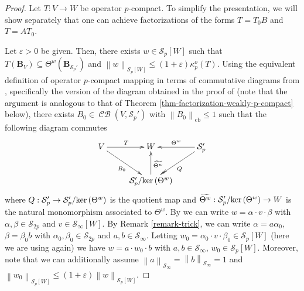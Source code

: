 \documentclass[11pt]{amsart}
\DeclareMathOperator{\cb}{cb}
\DeclareMathOperator{\CB}{\mathcal{CB}}
\newcommand{\n}[1]{ \left\|#1\right\| }
\numberwithin{equation}{section}
\def\ker{{\rm ker\, }}
\begin{document}
\begin{proof}
Let $T : V \to W$ be operator $p$-compact. To simplify the presentation, we will show separately that one can achieve factorizations of the forms $T = T_0B$ and $T=AT_0$.

Let $\varepsilon>0$ be given. Then, there exists $w \in \mathcal{S}_p[W]$ such that $T(\mathbf{B}_V) \subseteq \Theta^w(\mathbf{B}_{\mathcal{S}_p'})$ and $\n{w}_{\mathcal{S}_p[W]} \le (1+\varepsilon)\kappa_p^o(T)$.
Using the equivalent definition of operator $p$-compact mapping in terms of commutative diagrams from \cite[Def. 3.2]{ChaDiGa-Operator-p-compact}, specifically the version of the diagram obtained in 
the proof of \cite[Thm. 3.11]{ChaDiGa-Operator-p-compact} (note that the argument is analogous to that of Theorem \ref{thm-factorization-weakly-p-compact} below), there exists $B_0 \in \CB(V,\mathcal{S}_p')$ with $\n{B_0}_{\cb} \le 1$ such that the following diagram commutes
\[
\xymatrix{
V \ar[r]^{T} \ar[dr]_{B_0} &W & \mathcal{S}_p' \ar[l]_{\Theta^w} \ar@{->>}[ld]^Q\\
& \mathcal{S}_{p}'/\ker(\Theta^w) \ar[u]_{\widetilde{\Theta^w}} &
}
\]
where $Q : \mathcal{S}_p' \to \mathcal{S}_p'/\ker(\Theta^w)$ is the quotient map and $\widetilde{\Theta^w} : \mathcal{S}_{p}'/\ker(\Theta^w) \to W$ is the natural monomorphism associated to $\Theta^w$.
By \cite[Thm. 1.5]{Pisier-Asterisque} we can write $w = \alpha \cdot v \cdot \beta$ with $\alpha,\beta \in \mathcal{S}_{2p}$ and $v \in \mathcal{S}_\infty[W]$.
By Remark \ref{remark-trick}, we can write $\alpha= a \alpha_0$, $\beta = \beta_0 b$ with $\alpha_0,\beta_0 \in \mathcal{S}_{2p}$ and $a,b\in \mathcal{S}_\infty$. Letting $w_0 = \alpha_0 \cdot v \cdot \beta_0 \in \mathcal{S}_p[W]$ (here we are using \cite[Thm. 1.5]{Pisier-Asterisque} again) we have $w = a \cdot w_0 \cdot b$ with $a,b\in \mathcal{S}_\infty$, $w_0 \in \mathcal{S}_p[W]$.
Moreover, note that we can additionally assume $\n{a}_{\mathcal{S}_\infty} = \n{b}_{\mathcal{S}_\infty} = 1$ and $\n{w_0}_{\mathcal{S}_p[W]} \le (1+\varepsilon)\n{w}_{\mathcal{S}_p[W]}$.


\end{proof}
\end{document}
